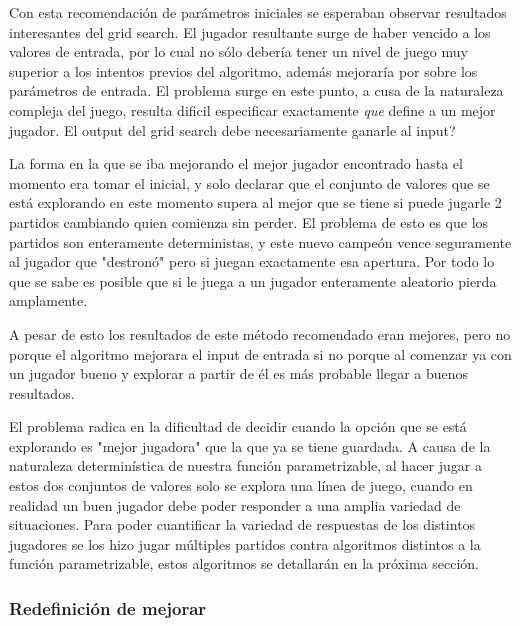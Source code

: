 \documentclass[A4paper,oneside,fleqn,11pt]{article}
\theoremstyle{definition}
\begin{document}
Con esta recomendación de parámetros iniciales se esperaban observar resultados interesantes del grid search. El jugador resultante surge de haber vencido a los valores de entrada, por lo cual no sólo debería tener un nivel de juego muy superior a los intentos previos del algoritmo, además mejoraría por sobre los parámetros de entrada. El problema surge en este punto, a cusa de la naturaleza compleja del juego, resulta dificil especificar exactamente \textit{que} define a un mejor jugador. El output del grid search debe necesariamente ganarle al input? 

La forma en la que se iba mejorando el mejor jugador encontrado hasta el momento era tomar el inicial, y solo declarar que el conjunto de valores que se está explorando en este momento supera al mejor que se tiene si puede jugarle 2 partidos cambiando quien comienza sin perder. El problema de esto es que los partidos son enteramente deterministas, y este nuevo campeón vence seguramente al jugador que "destronó" pero si juegan exactamente esa apertura. Por todo lo que se sabe es posible que si le juega a un jugador enteramente aleatorio pierda amplamente.

A pesar de esto los resultados de este método recomendado eran mejores, pero no porque el algoritmo mejorara el input de entrada si no porque al comenzar ya con un jugador bueno y explorar a partir de él es más probable llegar a buenos resultados. 

El problema radica en la dificultad de decidir cuando la opción que se está explorando es  "mejor jugadora" que la que ya se tiene guardada. A causa de la naturaleza determinística de nuestra función parametrizable, al hacer jugar a estos dos conjuntos de valores solo se explora una línea de juego, cuando en realidad un buen jugador debe poder responder a una amplia variedad de situaciones. Para poder cuantificar la variedad de respuestas de los distintos jugadores se los hizo jugar múltiples partidos contra algoritmos distintos a la función parametrizable, estos algoritmos se detallarán en la próxima sección.

\subsubsection {Redefinición de mejorar}
\end{document}
